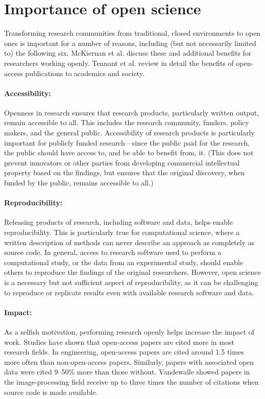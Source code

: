\documentclass[nobib]{tufte-handout}
\begin{document}
\section{Importance of open science}
\label{sec:importance}

Transforming research communities from traditional, closed environments to open
ones is important for a number of reasons, including (but not necessarily limited
to) the following six. McKiernan et al.\autocite{McKiernan:2016iz} discuss these
and additional benefits for researchers working openly.
Tennant et al.\autocite{Tennant:2016bi} review in detail the benefits
of open-access publications to academics and society.

\paragraph{Accessibility:}
Openness in research ensures that research products,
particularly written output, remain accessible to all. This includes the
research community, funders, policy makers, and the general public. Accessibility
of research products is particularly important for publicly funded
research---since the public paid for the research, the public should have access
to, and be able to benefit from, it.
(This does not prevent innovators or other parties from developing commercial
intellectual property based on the findings, but ensures that the original
discovery, when funded by the public, remains accessible to all.)

\paragraph{Reproducibility:}
Releasing products of research, including software and data, helps enable
reproducibility. This is particularly true for computational science, where a
written description of methods can never describe an approach as completely as
source code. In general, access to research software used to perform a
computational study, or the data from an experimental study, should enable
others to reproduce the findings of the original researchers.
However, open science is a necessary but not sufficient aspect of reproducibility,
as it can be challenging to reproduce or replicate results even with
available research software and data\autocite{Mesnard:2016,Barba:2016ky}.

\paragraph{Impact:}
As a selfish motivation, performing research openly helps increase the impact of work.
Studies have shown that open-access papers are cited more in most research fields.
In engineering, open-access papers are cited around 1.5 times more often than
non-open-access papers. Similarly, papers with associated
open data were cited 9--50\% more than those
without\autocite{Piwowar:2013cc,McKiernan:2016iz}.
Vandewalle\autocite{Vandewalle:2012cl} showed papers in the image-processing
field receive up to three times the number of citations when source code is
made available.
\end{document}
